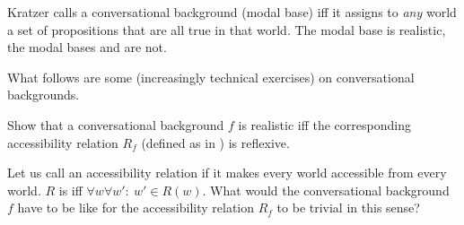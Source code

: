 \noindent Kratzer calls a conversational background (modal base)
 iff it assigns to \emph{any} world a set of
propositions that are all true in that world. The modal base
 is realistic, the modal bases
 and  are not.

\medskip
\noindent What follows are some (increasingly technical exercises) on
conversational backgrounds.

\begin{exercise}
	
	Show that a conversational background $f$ is realistic iff the
  corresponding accessibility relation $R_{f}$ (defined as in \Last)
  is reflexive. \eex
\end{exercise}

\begin{exercise}
	
	Let us call an accessibility relation  if it makes
  every world accessible from every world. $R$ is  iff
  $\forall w\forall w'\!:\ w'\in R(w)$. What would the conversational
  background $f$ have to be like for the accessibility relation
  $R_{f}$ to be trivial in this sense? \eex
\end{exercise}

